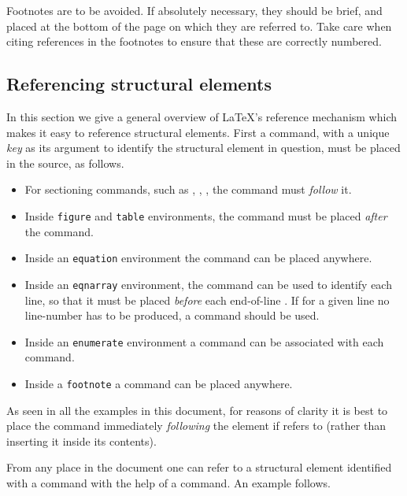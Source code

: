 \documentclass{cernyrep}
\begin{document}
Footnotes are to be avoided. If absolutely necessary, they should be
brief, and placed at the bottom of the page on which they are referred
to. Take care when citing references in the footnotes to ensure that
these are correctly numbered.

\subsection{Referencing structural elements}
\label{sec:crossref}

In this section we give a general overview of \LaTeX's reference
mechanism which makes it easy to reference structural elements. First
a  command, with a unique \emph{key} as its argument to
identify the structural element in question, must be placed in the
source, as follows.

\begin{itemize}
\item For sectioning commands, such as ,
      , , the  command
      must \emph{follow} it.
\item Inside \texttt{figure} and \texttt{table} environments, the 
       command must be placed \emph{after} the 
      command.
\item Inside an \texttt{equation} environment the  command
      can be placed anywhere.
\item Inside an \texttt{eqnarray} environment, the  command
      can be used to identify each line, so that it must be placed
      \emph{before} each end-of-line \Lcs{\bs}. If for a given line no
      line-number has to be produced, a  command should
      be used.
\item Inside an \texttt{enumerate} environment a  command
      can be associated with each  command.
\item Inside a \texttt{footnote} a  command can be placed
      anywhere.
\end{itemize}
As seen in all the examples in this document, for reasons of clarity
it is best to place the  command immediately
\emph{following} the element if refers to (rather than inserting it
inside its contents).

From any place in the document one can refer to a structural element
identified with a  command with the help of a 
command. An example follows.
\end{document}
